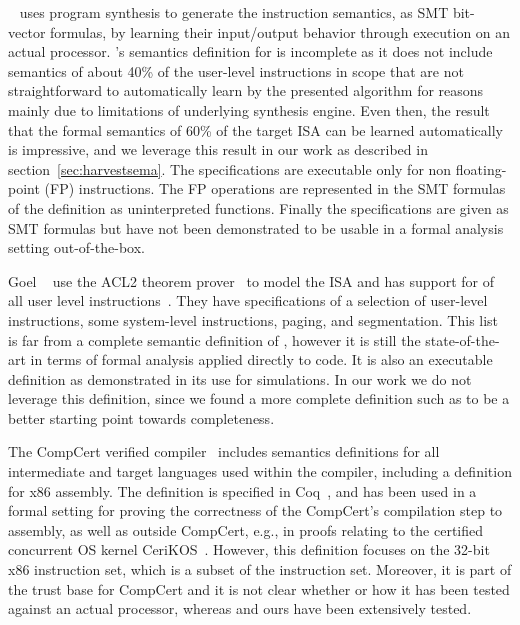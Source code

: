 \Strata~\cite{Heule2016a} uses program synthesis to generate the instruction
semantics, as SMT bit-vector formulas, by learning their input/output behavior
through execution on an actual processor. \Strata's semantics definition for
\ISA is incomplete as it does not include semantics of about 40\% of the
user-level instructions in scope that are not straightforward to automatically learn by the presented algorithm for reasons mainly due to limitations of underlying synthesis engine. Even then,
the result that the formal semantics of 60\% of the target \ISA ISA can be learned automatically
is impressive, and we leverage this result in our work as described in
section~\ref{sec:harvestsema}.
The specifications are executable only for non floating-point (FP) instructions.
The FP operations are represented in the SMT formulas of the definition as
uninterpreted functions. Finally the specifications are given as SMT formulas
but have not been demonstrated to be usable in a formal analysis setting out-of-the-box.


Goel \etal~\cite{Goel:FMCAD14} use the ACL2 theorem prover~\cite{ACL2:Kaufmann2000} to model the \ISA ISA and has support for
\goelPerc{} of all user level instructions~\cite{GoelList}. They have specifications of a selection
of user-level instructions, some system-level instructions, paging, and
segmentation. This list is far from a complete semantic definition of \ISA,
however it is still the state-of-the-art in terms of formal analysis applied
directly to \ISA code. It is also an executable definition as demonstrated in
its use for simulations. In our work we do not leverage this definition, since
we found a more complete definition such as \Strata to be a better starting
point towards completeness.

The CompCert verified compiler~\cite{Leroy:2009} includes semantics
definitions for all intermediate and target languages used within the compiler,
including a definition for x86 assembly. The definition is specified in Coq~\cite{Coq}, and has been used in a formal
setting for proving the correctness of the CompCert's compilation step to assembly,
as well as outside CompCert, e.g., in proofs relating to the certified concurrent
OS kernel CeriKOS~\cite{Gu:2016}. However, this definition focuses on the
32-bit x86 instruction set, which is a subset of the \ISA instruction 
set.
Moreover, it is part of the trust base for CompCert and it is not clear
whether or how it has been tested against an actual processor, whereas
\Strata and ours have been extensively tested.

